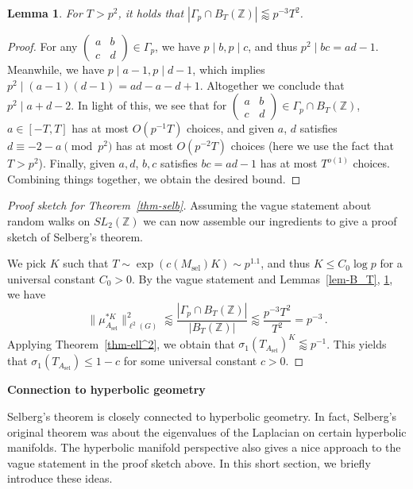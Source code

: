 \documentclass[12pt]{amsart}
\newtheorem{lemma}[theorem]{Lemma}
\newcommand{\ZZ}{\mathbb{Z}}
\begin{document}
\begin{lemma}\label{lem-Gamma_pcap B_T}
    For $T>p^2$, it holds that $|\Gamma_p\cap B_T(\ZZ)|\lessapprox p^{-3}T^2$. 
\end{lemma}
\begin{proof}
    For any $\left(\begin{matrix}
        a&b\\
        c&d
    \end{matrix}\right)\in \Gamma_p$, we have $p\mid b,p\mid c$, and thus $p^2\mid bc=ad-1$. Meanwhile, we have $p\mid a-1,p\mid d-1$, which implies $p^2\mid (a-1)(d-1)=ad-a-d+1$. Altogether we conclude that $p^2\mid a+d-2$. In light of this, we see that for $\left(\begin{matrix}
        a&b\\
        c&d
    \end{matrix}\right)\in \Gamma_p\cap B_T(\ZZ)$, $a\in [-T,T]$ has at most $O(p^{-1}T)$ choices, and given $a$, $d$ satisfies $d\equiv -2-a\pmod{p^2}$ has at most $O(p^{-2}T)$ choices (here we use the fact that $T>p^2$). Finally, given $a,d$, $b,c$ satisfies $bc=ad-1$ has at most $T^{o(1)}$ choices. Combining things together, we obtain the desired bound.
\end{proof}

\begin{proof}[Proof sketch for Theorem~\ref{thm-selb}]
Assuming the vague statement about random walks on $SL_2(\ZZ)$ we can now assemble our ingredients to give a proof sketch of Selberg's theorem.

    We pick $K$ such that $T\sim\exp(c(M_{\operatorname{sel}})K)\sim p^{1.1}$, and thus $K\le C_0\log p$ for a universal constant $C_0>0$. By the vague statement and Lemmas~\ref{lem-B_T}, \ref{lem-Gamma_pcap B_T}, we have 
    \[
    \|\mu_{A_{\operatorname{sel}}}^{\ast K}\|_{\ell^2(G)}^2\lessapprox \frac{|\Gamma_p\cap B_T(\ZZ)|}{|B_T(\ZZ)|}\lessapprox \frac{p^{-3}T^2}{T^2}=p^{-3}\,.
    \]
    Applying Theorem~\ref{thm-ell^2}, we obtain that $\sigma_1(T_{A_{\operatorname{sel}}})^K\lessapprox p^{-1}$. This yields that $\sigma_1(T_{A_{\operatorname{sel}}})\le 1-c$ for some universal constant $c>0$.  
\end{proof}

\textbf{Connection to hyperbolic geometry}

Selberg's theorem is closely connected to hyperbolic geometry.   In fact,  Selberg's original theorem was about the eigenvalues of the Laplacian on certain hyperbolic manifolds.   The hyperbolic manifold perspective also gives a nice approach to the vague statement in the proof sketch above.   In this short section,  we briefly introduce these ideas.  
\end{document}
